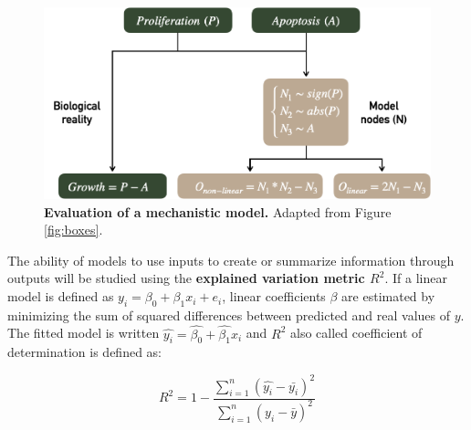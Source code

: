 \documentclass[a4paper,12pt,twoside,onecolumn,openright,final,oldfontcommands]{memoir}
\begin{document}
\begin{figure}

{\centering \includegraphics[width=0.8\linewidth]{fig/model-simulation} 

}

\caption[Definition of two distinct mechanistic models]{\textbf{Evaluation of a mechanistic model.}
Adapted from Figure \ref{fig:boxes}.}\label{fig:model-simulation}
\end{figure}







The ability of models to use inputs to create or summarize information
through outputs will be studied using the \textbf{explained variation
metric \(R^2\)}. If a linear model is defined as
\(y_i=\beta_0+\beta_1x_i+e_i\), linear coefficients \(\beta\) are
estimated by minimizing the sum of squared differences between predicted
and real values of \(y\). The fitted model is written
\(\hat{y_i}=\hat{\beta_0}+\hat{\beta_1}x_i\) and \(R^2\) also called
coefficient of determination is defined as:

\[R^2=1-\dfrac{\sum_{i=1}^{n} (\hat{y_i}-\bar{y_i})^2}{\sum_{i=1}^{n}  (y_i-\bar{y})^2}\]
\end{document}
